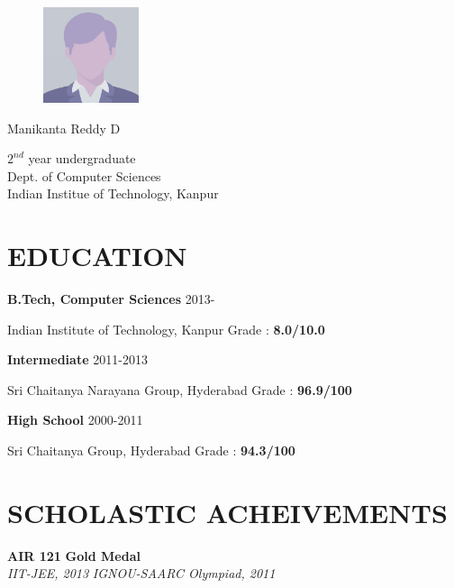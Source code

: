 \documentclass{article}
\newcommand{\sepspace}{\vspace*{0.8em}}
\newcommand{\MyName}[1]{
		\huge \usefont{OT1}{phv}{b}{n} \hfill #1 		
		\par \normalsize \normalfont
		}
\newcommand{\NewPart}[1]{\section*{\uppercase{#1}}}
\newcommand{\EducationEntry}[4]{
		\noindent \textbf{#1} \hfill 	{#2} \par				
		\noindent #3 \hfill	
		Grade : \textbf{#4} 	
		}
\newcommand{\ScholasticAcheivements}[4]{
		\noindent \textbf{#1} \hfill \textbf{#2} \\
		\textit{#3}	 \hfill	 \textit{ #4} 	
		\normalsize \par
		}
\begin{document}
\begin{figure}
	\vspace*{-3em}
		\includegraphics[width=0.25\textwidth]{photo.png}
\end{figure}

\MyName{Manikanta Reddy D}
\begin{flushright}
	$2^{nd}$ year undergraduate\\
	Dept. of Computer Sciences\\
	Indian Institue of Technology, Kanpur
\end{flushright}

\sepspace

\NewPart{Education}{}

\EducationEntry{B.Tech, Computer Sciences}{2013-}{Indian Institute of Technology, Kanpur}{8.0/10.0}

\sepspace

\EducationEntry{Intermediate}{2011-2013}{Sri Chaitanya Narayana Group, Hyderabad}{96.9/100}

\sepspace

\EducationEntry{High School}{2000-2011}{Sri Chaitanya Group, Hyderabad}{94.3/100}


\NewPart{Scholastic Acheivements}{}

\ScholasticAcheivements{AIR 121}{Gold Medal}{IIT-JEE, 2013}{IGNOU-SAARC Olympiad, 2011}

\sepspace
\end{document}

